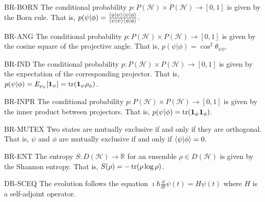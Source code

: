 \begin{condition}{BR-BORN}
	The conditional probability $p : P(\mathcal{H}) \times P(\mathcal{H}) \to [0,1]$ is given by the Born rule. That is, $p(\psi|\phi) = \frac{\< \phi | \psi \>\< \psi | \phi \>}{\< \psi | \psi \>\< \phi | \phi \>}$.
\end{condition}

\begin{condition}{BR-ANG}
	The conditional probability $p : P(\mathcal{H}) \times P(\mathcal{H}) \to [0,1]$ is given by the cosine square of the projective angle. That is, $p(\psi|\phi) = \cos^2 \theta_{\psi\phi}$.
\end{condition}

\begin{condition}{BR-IND}
	The conditional probability $p : P(\mathcal{H}) \times P(\mathcal{H}) \to [0,1]$ is given by the expectation of the corresponding projector. That is, $p(\psi|\phi) = E_{\rho_{\phi}}[\indicator[\psi]] = \tr(\indicator[\psi] \rho_{\phi})$.
\end{condition}

\begin{condition}{BR-INPR}
	The conditional probability $p : P(\mathcal{H}) \times P(\mathcal{H}) \to [0,1]$ is given by the inner product between projectors. That is, $p(\psi|\phi) =   \tr(\indicator[\psi] \indicator[\phi])$.
\end{condition}

\begin{condition}{BR-MUTEX}
	Two states are mutually exclusive if and only if they are orthogonal. That is, $\psi$ and $\phi$ are mutually exclusive if and only if $\<\psi|\phi\>=0$.
\end{condition}

\begin{condition}{BR-ENT}
	The entropy $S : D(\mathcal{H}) \to \mathbb{R}$ for an ensemble $\rho \in D(\mathcal{H})$ is given by the Shannon entropy. That is, $S(\rho) = -\tr(\rho \log \rho)$.
\end{condition}

\begin{condition}{DR-SCEQ}
	The evolution follows the equation $\imath \hbar \frac{d}{dt} \psi(t) = H \psi(t)$ where $H$ is a self-adjoint operator.
\end{condition}

